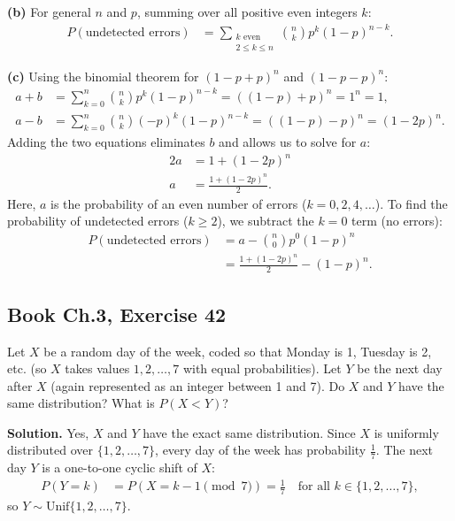 \documentclass[11pt,a4paper]{article}
\begin{document}
\vspace{4pt}
\noindent \textbf{(b)} For general $n$ and $p$, summing over all positive even integers $k$:
\begin{align*}
P(\text{undetected errors}) &= \sum_{\substack{k \text{ even} \\ 2 \le k \le n}} \binom{n}{k} p^k (1-p)^{n-k}.
\end{align*}

\vspace{4pt}
\noindent \textbf{(c)} Using the binomial theorem for $(1-p + p)^n$ and $(1-p - p)^n$:
\begin{align*}
a + b &= \sum_{k=0}^{n} \binom{n}{k} p^k (1-p)^{n-k} = \left( (1-p) + p \right)^n = 1^n = 1, \\
a - b &= \sum_{k=0}^{n} \binom{n}{k} (-p)^k (1-p)^{n-k} = \left( (1-p) - p \right)^n = (1-2p)^n.
\end{align*}
Adding the two equations eliminates $b$ and allows us to solve for $a$:
\begin{align*}
2a &= 1 + (1-2p)^n \\
a &= \frac{1 + (1-2p)^n}{2}.
\end{align*}
Here, $a$ is the probability of an even number of errors ($k = 0, 2, 4, \dots$). To find the probability of undetected errors ($k \ge 2$), we subtract the $k = 0$ term (no errors):
\begin{align*}
P(\text{undetected errors}) &= a - \binom{n}{0} p^0 (1-p)^n \\
&= \frac{1 + (1-2p)^n}{2} - (1-p)^n.
\end{align*}

\vspace{10pt}
\subsection{Book Ch.3, Exercise 42}
\begin{tcolorbox}[title={Book Ch.3, Exercise 42}]
Let $X$ be a random day of the week, coded so that Monday is 1, Tuesday is 2, etc. (so $X$ takes values $1, 2, \dots, 7$ with equal probabilities). Let $Y$ be the next day after $X$ (again represented as an integer between 1 and 7). Do $X$ and $Y$ have the same distribution? What is $P(X < Y)$?
\end{tcolorbox}

\noindent \textbf{Solution.} Yes, $X$ and $Y$ have the exact same distribution. Since $X$ is uniformly distributed over $\{1, 2, \dots, 7\}$, every day of the week has probability $\frac{1}{7}$. The next day $Y$ is a one-to-one cyclic shift of $X$:
\begin{align*}
P(Y = k) &= P(X = k - 1 \pmod 7) = \frac{1}{7} \quad \text{for all } k \in \{1, 2, \dots, 7\},
\end{align*}
so $Y \sim \text{Unif}\{1, 2, \dots, 7\}$.
\end{document}
